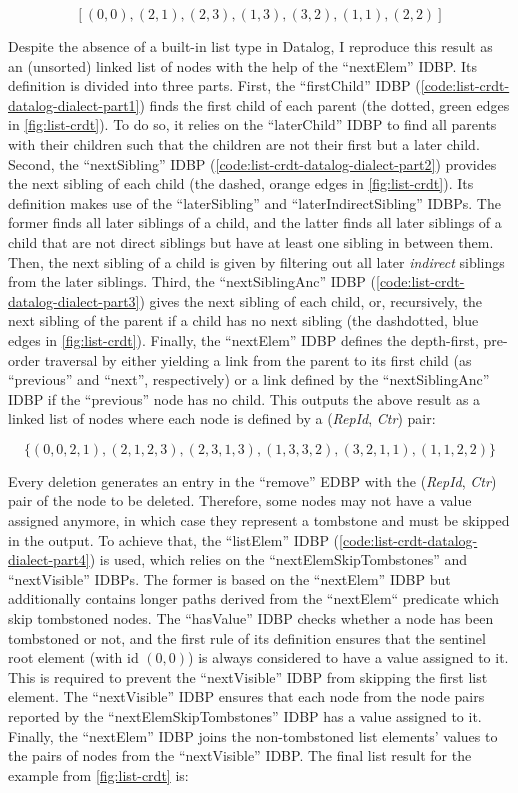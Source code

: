 \[[ (0,0), (2,1), (2,3), (1,3), (3,2), (1,1), (2,2) ]\]

Despite the absence of a built-in list type in Datalog, I reproduce this result
as an (unsorted) linked list of nodes with the help of the ``nextElem'' \ac{IDBP}.
Its definition is divided into three parts.
First, the ``firstChild'' \ac{IDBP} (\ref{code:list-crdt-datalog-dialect-part1})
finds the first child of each parent
(the dotted, green edges in \ref{fig:list-crdt}).
To do so, it relies on the ``laterChild'' \ac{IDBP} to find all parents with
their children such that the children are not their first but a later child.
Second, the ``nextSibling'' \ac{IDBP} (\ref{code:list-crdt-datalog-dialect-part2})
provides the next sibling of each child
(the dashed, orange edges in \ref{fig:list-crdt}).
Its definition makes use of the ``laterSibling'' and ``laterIndirectSibling''
\acp{IDBP}. The former finds all later siblings of a child, and the latter
finds all later siblings of a child that are not direct siblings but have
at least one sibling in between them.
Then, the next sibling of a child is given by filtering out all later
\emph{indirect} siblings from the later siblings.
Third, the ``nextSiblingAnc'' \ac{IDBP} (\ref{code:list-crdt-datalog-dialect-part3})
gives the next sibling of each child, or, recursively,
the next sibling of the parent if a child has no next sibling
(the dashdotted, blue edges in \ref{fig:list-crdt}).
Finally, the ``nextElem'' \ac{IDBP} defines the depth-first, pre-order traversal
by either yielding a link from the parent to its first child (as ``previous''
and ``next'', respectively) or a link defined by the ``nextSiblingAnc'' \ac{IDBP}
if the ``previous'' node has no child.
This outputs the above result as a linked list of nodes where each node is
defined by a (\textit{RepId}, \textit{Ctr}) pair:

\[\{ (0,0,2,1), (2,1,2,3), (2,3,1,3), (1,3,3,2), (3,2,1,1), (1,1,2,2) \}\]

Every deletion generates an entry in the ``remove'' \ac{EDBP} with the
(\textit{RepId}, \textit{Ctr}) pair of the node to be deleted.
Therefore, some nodes may not have a value assigned anymore, in which case
they represent a tombstone and must be skipped in the output.
To achieve that, the ``listElem'' \ac{IDBP}
(\ref{code:list-crdt-datalog-dialect-part4}) is used, which relies on
the ``nextElemSkipTombstones'' and ``nextVisible'' \acp{IDBP}.
The former is based on the ``nextElem'' \ac{IDBP} but additionally contains
longer paths derived from the ``nextElem`` predicate which skip tombstoned nodes.
The ``hasValue'' \ac{IDBP} checks whether a node has been tombstoned or not,
and the first rule of its definition ensures that the sentinel root element
(with id \((0, 0)\)) is always considered to have a value assigned to it.
This is required to prevent the ``nextVisible'' \ac{IDBP} from skipping the
first list element.
The ``nextVisible'' \ac{IDBP} ensures that each node from the node pairs
reported by the  ``next\-Elem\-Skip\-Tombstones'' \ac{IDBP} has a value assigned to it.
Finally, the ``next\-Elem'' \ac{IDBP} joins the non-tombstoned list elements'
values to the pairs of nodes from the ``next\-Visible'' \ac{IDBP}.
The final list result for the example from \ref{fig:list-crdt} is:

